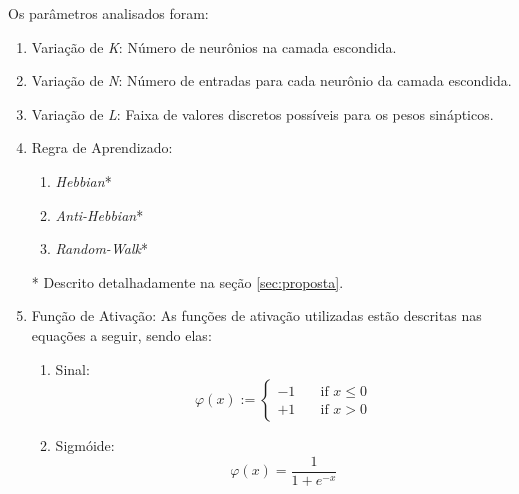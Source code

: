 \documentclass[12pt]{article}
\begin{document}
            Os parâmetros analisados foram:
            \begin{enumerate}
                \item Variação de \textit{K}: Número de neurônios na camada escondida.
            
                \item Variação de \textit{N}: Número de entradas para cada neurônio da camada escondida.
                
                \item Variação de \textit{L}: Faixa de valores discretos possíveis para os pesos sinápticos.
                
                \item Regra de Aprendizado:
                \begin{enumerate}
                    \item \textit{Hebbian}*
                    \item \textit{Anti-Hebbian}*
                    \item \textit{Random-Walk}*
                \end{enumerate}
                * Descrito detalhadamente na seção \ref{sec:proposta}.

                \item Função de Ativação: As funções de ativação utilizadas estão descritas nas equações a seguir, sendo elas:
                
                \begin{enumerate}
                    \item Sinal:
                        \begin{equation}
                            \label{eq:act_func_signal}
                            \textit{$\varphi(x)$} :=
                            \begin{cases}
                                -1 & \quad \text{if } x \leq 0 \\
                                +1 & \quad \text{if } x > 0
                            \end{cases}
                        \end{equation}
                    
                    \item Sigmóide:
                        \begin{equation}
                            \label{eq:act_func_sigmoid}
                            \textit{$\varphi(x)$} = \frac{1}{1 + e^{-x}}
                        \end{equation}
                    

\end{enumerate}
\end{enumerate}
\end{document}
